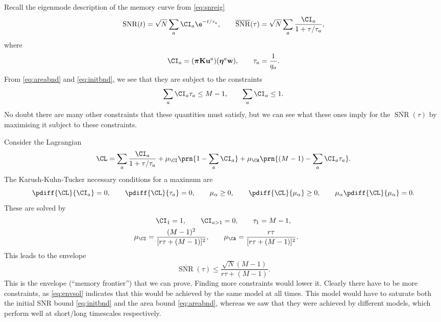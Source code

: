 \documentclass[12pt]{article}
\newcommand{\eqm}{\pi}
\newcommand{\eq}{\boldsymbol{\eqm}}
\newcommand{\wm}{w}
\newcommand{\w}{\mathbf{\wm}}
\newcommand{\encm}{K}
\newcommand{\enc}{\mathbf{\encm}}
\newcommand{\evrm}{u}
\newcommand{\evr}{\mathbf{\evrm}}
\newcommand{\evlm}{\eta}
\newcommand{\evl}{\boldsymbol{\evlm}}
\DeclareMathOperator{\snr}{SNR}
\newcommand{\snrb}{\overline{\snr}}
\begin{document}
Recall the eigenmode description of the memory curve from \cref{eq:snreig}
%
\begin{equation*}
  \snr(t) = \sqrt{N} \sum_a \CI_a \e^{-t/\tau_a},
  \qquad
  \snrb(\tau) = \sqrt{N} \sum_a \frac{\CI_a}{1+\tau/\tau_a},
\end{equation*}
%
where
%
\begin{equation*}
  \CI_a = (\eq \enc \evr^a) (\evl^a \w),
  \qquad
  \tau_a = \frac{1}{q_a}.
\end{equation*}
%
From \eqref{eq:areabnd} and \eqref{eq:initbnd}, we see that they are subject to the constraints
%
\begin{equation}\label{eq:coeffconstr}
  \sum_a \CI_a \tau_a \leq M-1,
  \qquad
  \sum_a \CI_a \leq 1.
\end{equation}
%
No doubt there are many other constraints that these quantities must satisfy, but we can see what these ones imply for the \(\snrb(\tau)\) by maximising it subject to these constraints.

Consider the Lagrangian
%
\begin{equation}\label{eq:envlagrangian}
  \CL = \sum_a \frac{\CI_a}{1+\tau/\tau_a} + \mu_\CI \prn{1 - \sum_a \CI_a} + \mu_\CA \prn{(M-1) - \sum_a \CI_a \tau_a}.
\end{equation}
%
The Karush-Kuhn-Tucker necessary conditions for a maximum are
%
\begin{equation}\label{eq:envKTcond}
  \pdiff{\CL}{\CI_a} = 0, \qquad
  \pdiff{\CL}{\tau_a} = 0, \qquad
  \mu_\alpha \geq 0, \qquad
  \pdiff{\CL}{\mu_\alpha} \geq 0, \qquad
  \mu_\alpha\pdiff{\CL}{\mu_\alpha} = 0.
\end{equation}
%
These are solved by
%
\begin{equation}\label{eq:envsol}
\begin{gathered}
  \CI_1 = 1, \qquad
  \CI_{a>1} = 0, \qquad
  \tau_1 = M-1, \\
  \mu_\CI = \frac{(M-1)^2}{[r\tau + (M-1)]^2}, \qquad
  \mu_\CA = \frac{r\tau}{[r\tau+(M-1)]^2}. \qquad
\end{gathered}
\end{equation}
%
This leads to the envelope
%
\begin{equation}\label{eq:env}
  \snrb(\tau) \leq \frac{\sqrt{N}(M-1)}{r\tau + (M-1)}.
\end{equation}
%
This is the envelope (``memory frontier'') that we can prove.
Finding more constraints would lower it.
Clearly there have to be more constraints, as \eqref{eq:envsol} indicates that this would be achieved by the same model at all times.
This model would have to saturate both the initial SNR bound \eqref{eq:initbnd} and the area bound \eqref{eq:areabnd}, whereas we saw that they were achieved by different models, which perform well at short/long timescales respectively.
\end{document}
